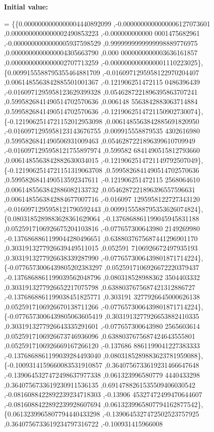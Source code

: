 {\bfseries Initial value\+:}
\begin{DoxyCode}
= \{\{0.0000000000000004440892099 ,-0.0000000000000006127073601 ,0.0000000000000002490853223 ,-0.000000000000
      0001475682961 ,-0.0000000000000005937598529 ,0.9999999999999998889776975 ,0.0000000000000004305663790 ,0.000
      0000000000003636161857 ,0.0000000000000002707713259 ,-0.0000000000000001110223025\},
\{0.0099155588795355464881709 ,-0.0160971295958122970204407 ,0.0061485563842885501001367 ,-0.121906251472115
      0486396439 ,-0.0160971295958123629399328 ,0.0546287221896395863707241 ,0.5995826841490514702570636 ,0.006148
      5563842883063714884 ,0.5995826841490514702570636 ,-0.1219062514721150902730074\},
\{-0.1219062514721152012953098 ,0.0061485563842885691820950 ,-0.0160971295958123143676755 ,0.009915558879535
      4302616980 ,0.5995826841490506931009463 ,0.0546287221896399610709949 ,-0.0160971295958121755897974 ,0.599582
      6841490515812793660 ,0.0061485563842882630034015 ,-0.1219062514721149792507049\},
\{-0.1219062514721151319063708 ,0.5995826841490514702570636 ,0.5995826841490513592347611 ,-0.121906251472115
      2568064610 ,0.0061485563842886082133732 ,0.0546287221896396557596631 ,0.0061485563842884677007716 ,-0.016097
      1295958122727343120 ,-0.0160971295958121790592443 ,0.0099155588795353626074824\},
\{0.0803185289883628361629064 ,-0.1376868861199045945831188 ,0.0525917106926675204103816 ,-0.077657300643980
      2149269980 ,-0.1376868861199044280496651 ,0.6388037675687441296901170 ,0.3031913277926639449511015 ,0.052591
      7106926672497935193 ,0.3031913277926638339287990 ,-0.0776573006439801871714224\},
\{-0.0776573006439805202383297 ,0.0525917106926672220379437 ,-0.1376868861199039562048796 ,0.080318528988362
      3504403332 ,0.3031913277926652217075798 ,0.6388037675687421312886727 ,-0.1376868861199038451825771 ,0.303191
      3277926645000626138 ,0.0525917106926670138711266 ,-0.0776573006439801871714224\},
\{-0.0776573006439805063605419 ,0.3031913277926653882410335 ,0.3031913277926643335291601 ,-0.077657300643980
      2565603614 ,0.0525917106926673746936096 ,0.6388037675687424643555801 ,0.0525917106926669167266120 ,-0.137686
      8861199041227383333 ,-0.1376868861199039284493040 ,0.0803185289883623781959088\},
\{-0.1009314159660083531910857 ,0.3640756733619231466647648 ,-0.1390645327472498637977338 ,0.061323996580779
      4440433298 ,0.3640756733619230911536135 ,0.6914788261535509406030542 ,-0.0816088422892239234718303 ,-0.13906
      45327472499470644607 ,-0.0816088422892239928607694 ,0.0613239965807794162877542\},
\{0.0613239965807794440433298 ,-0.1390645327472502523757925 ,0.3640756733619234797316722 ,-0.100931415966008

\end{DoxyCode}

